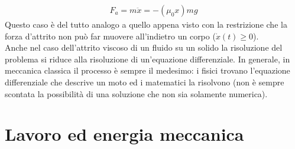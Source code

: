 \begin{align*}
	F_a = m \ddot{x} = -(\mu_0 x)mg
\end{align*}
Questo caso è del tutto analogo a quello appena visto con la restrizione che la forza d'attrito non può far muovere all'indietro un corpo ($\dot{x}(t)\geq 0$).\\
Anche nel caso dell'attrito viscoso di un fluido su un solido la risoluzione del problema si riduce alla risoluzione di un'equazione differenziale. In generale, in meccanica classica il processo è sempre il medesimo: i fisici trovano l'equazione differenziale che descrive un moto ed i matematici la risolvono (non è sempre scontata la possibilità di una soluzione che non sia solamente numerica). 
\section{Lavoro ed energia meccanica}
